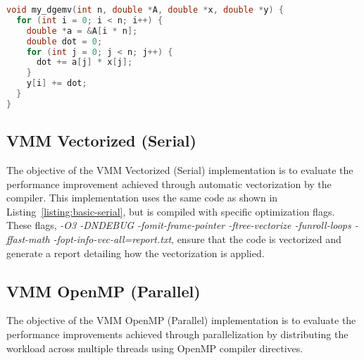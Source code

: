 \begin{lstlisting}[caption={\textbf{Naive implementation of matrix-vector multiplication using a double-nested loop.} The VMM Basic (Serial) and VMM Vectorized (Serial) implementations use the same source code. The inner loop is carefully structured to only use the loop index variable \(j\), ensuring proper vectorization when compiler flags are applied.},label={listing:basic-serial},name=basic-serial,float=htbp,style=mystyle,language=C++]
void my_dgemv(int n, double *A, double *x, double *y) {
  for (int i = 0; i < n; i++) {
    double *a = &A[i * n];
    double dot = 0;
    for (int j = 0; j < n; j++) {
      dot += a[j] * x[j];
    }
    y[i] += dot;
  }
}
\end{lstlisting}

\subsection{VMM Vectorized (Serial)}
\label{subsec:vmm-vectorized-serial}

The objective of the VMM Vectorized (Serial) implementation is to evaluate the performance improvement achieved through automatic vectorization by the compiler. This implementation uses the same code as shown in Listing~\ref{listing:basic-serial}, but is compiled with specific optimization flags. These flags, \textit{-O3 -DNDEBUG -fomit-frame-pointer -ftree-vectorize -funroll-loops -ffast-math -fopt-info-vec-all=report.txt}, ensure that the code is vectorized and generate a report detailing how the vectorization is applied.

\subsection{VMM OpenMP (Parallel)}
\label{subsec:vmm-openmp-parallel}

The objective of the VMM OpenMP (Parallel) implementation is to evaluate the performance improvements achieved through parallelization by distributing the workload across multiple threads using OpenMP compiler directives.



